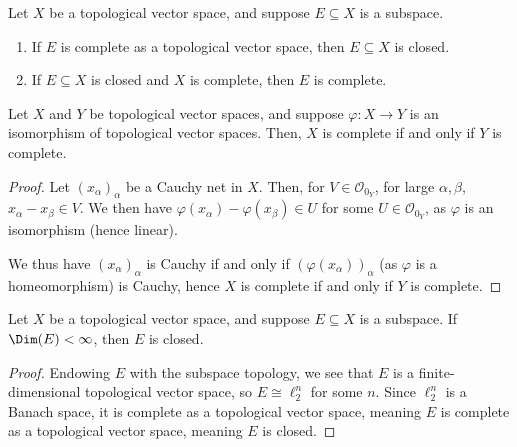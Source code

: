 \documentclass[10pt]{mypackage}
\begin{document}
\begin{proposition}
  Let $X$ be a topological vector space, and suppose $E\subseteq X$ is a subspace.
  \begin{enumerate}[(1)]
    \item If $E$ is complete as a topological vector space, then $E\subseteq X$ is closed.
    \item If $E\subseteq X$ is closed and $X$ is complete, then $E$ is complete.
  \end{enumerate}
\end{proposition}
\begin{proposition}
  Let $X$ and $Y$ be topological vector spaces, and suppose $\varphi: X\rightarrow Y$ is an isomorphism of topological vector spaces. Then, $X$ is complete if and only if $Y$ is complete.
\end{proposition}
\begin{proof}
  Let $\left(x_{\alpha}\right)_{\alpha}$ be a Cauchy net in $X$. Then, for $V\in \mathcal{O}_{0_Y}$, for large $\alpha,\beta$, $x_{\alpha} - x_{\beta}\in V$. We then have $\varphi\left(x_{\alpha}\right) - \varphi\left(x_{\beta}\right)\in U$ for some $U\in \mathcal{O}_{0_Y}$, as $\varphi$ is an isomorphism (hence linear).\newline

  We thus have $\left(x_{\alpha}\right)_{\alpha}$ is Cauchy if and only if $\left(\varphi\left(x_{\alpha}\right)\right)_{\alpha}$ (as $\varphi$ is a homeomorphism) is Cauchy, hence $X$ is complete if and only if $Y$ is complete.
\end{proof}
\begin{corollary}
  Let $X$ be a topological vector space, and suppose $E\subseteq X$ is a subspace. If $\Dim(E) < \infty$, then $E$ is closed.
\end{corollary}
\begin{proof}
  Endowing $E$ with the subspace topology, we see that $E$ is a finite-dimensional topological vector space, so $E\cong \ell_{2}^{n}$ for some $n$. Since $\ell_{2}^{n}$ is a Banach space, it is complete as a topological vector space, meaning $E$ is complete as a topological vector space, meaning $E$ is closed.
\end{proof}
\end{document}
